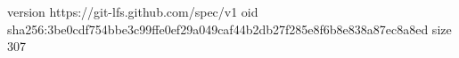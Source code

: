 version https://git-lfs.github.com/spec/v1
oid sha256:3be0cdf754bbe3c99ffe0ef29a049caf44b2db27f285e8f6b8e838a87ec8a8ed
size 307
